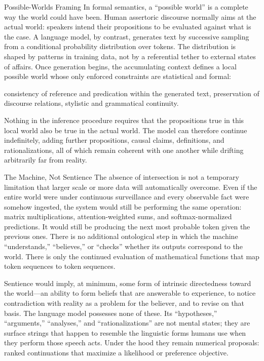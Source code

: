 Possible-Worlds Framing
In formal semantics, a “possible world” is a complete way the world could have been. Human assertoric discourse normally aims at the actual world: speakers intend their propositions to be evaluated against what is the case. A language model, by contrast, generates text by successive sampling from a conditional probability distribution over tokens. The distribution is shaped by patterns in training data, not by a referential tether to external states of affairs. Once generation begins, the accumulating context defines a local possible world whose only enforced constraints are statistical and formal:

consistency of reference and predication within the generated text,
preservation of discourse relations,
stylistic and grammatical continuity.

Nothing in the inference procedure requires that the propositions true in this local world also be true in the actual world. The model can therefore continue indefinitely, adding further propositions, causal claims, definitions, and rationalizations, all of which remain coherent with one another while drifting arbitrarily far from reality.

The Machine, Not Sentience
The absence of intersection is not a temporary limitation that larger scale or more data will automatically overcome. Even if the entire world were under continuous surveillance and every observable fact were somehow ingested, the system would still be performing the same operation: matrix multiplications, attention-weighted sums, and softmax-normalized predictions. It would still be producing the next most probable token given the previous ones. There is no additional ontological step in which the machine “understands,” “believes,” or “checks” whether its outputs correspond to the world. There is only the continued evaluation of mathematical functions that map token sequences to token sequences.

Sentience would imply, at minimum, some form of intrinsic directedness toward the world—an ability to form beliefs that are answerable to experience, to notice contradiction with reality as a problem for the believer, and to revise on that basis. The language model possesses none of these. Its “hypotheses,” “arguments,” “analyses,” and “rationalizations” are not mental states; they are surface strings that happen to resemble the linguistic forms humans use when they perform those speech acts. Under the hood they remain numerical proposals: ranked continuations that maximize a likelihood or preference objective.

